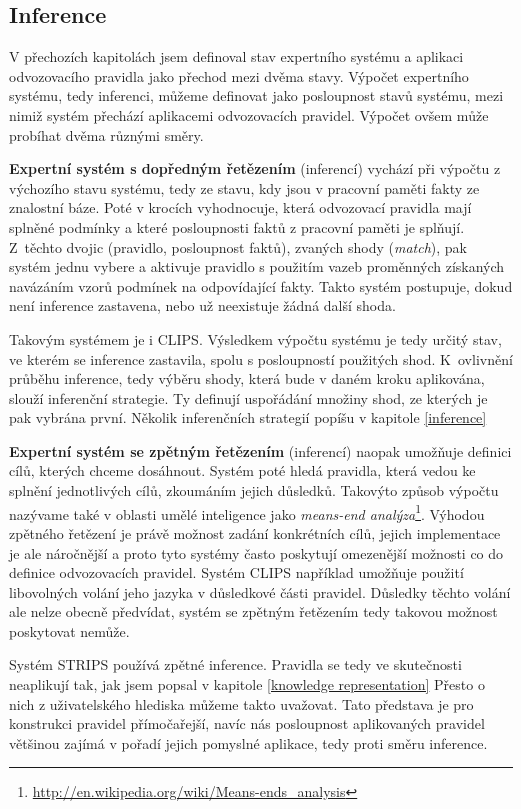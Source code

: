 \subsection{Inference}

V přechozích kapitolách jsem definoval stav expertního systému a aplikaci
odvozovacího pravidla jako přechod mezi dvěma stavy. Výpočet expertního systému,
tedy inferenci, můžeme definovat jako posloupnost stavů systému, mezi nimiž
systém přechází aplikacemi odvozovacích pravidel. Výpočet ovšem může probíhat
dvěma různými směry.

\textbf{Expertní systém s dopředným řetězením} (inferencí) vychází při výpočtu z
výchozího stavu systému, tedy ze stavu, kdy jsou v pracovní paměti fakty ze
znalostní báze. Poté v krocích vyhodnocuje, která odvozovací pravidla mají
splněné podmínky a které posloupnosti faktů z pracovní paměti je splňují.
Z~těchto dvojic (pravidlo, posloupnost faktů), zvaných shody (\emph{match}), pak
systém jednu vybere a aktivuje pravidlo s použitím vazeb proměnných získaných
navázáním vzorů podmínek na odpovídající fakty. Takto systém postupuje, dokud není
inference zastavena, nebo už neexistuje žádná další shoda.

Takovým systémem je i CLIPS. Výsledkem výpočtu systému je tedy určitý stav, ve
kterém se inference zastavila, spolu s posloupností použitých shod. K~ovlivnění
průběhu inference, tedy výběru shody, která bude v daném kroku aplikována,
slouží inferenční strategie. Ty definují uspořádání množiny shod, ze kterých je
pak vybrána první. Několik inferenčních strategií popíšu v kapitole \ref{inference}

\textbf{Expertní systém se zpětným řetězením} (inferencí) naopak umožňuje
definici cílů, kterých chceme dosáhnout. Systém poté hledá pravidla, která
vedou ke splnění jednotlivých cílů, zkoumáním jejich důsledků. Takovýto způsob
výpočtu nazývame také v oblasti umělé inteligence jako \emph{means-end
analýza}\footnote{\url{http://en.wikipedia.org/wiki/Means-ends\_analysis}}.
Výhodou zpětného řetězení je právě možnost zadání konkrétních cílů, jejich
implementace je ale náročnější a proto tyto systémy často poskytují omezenější
možnosti co do definice odvozovacích pravidel. Systém CLIPS například umožňuje
použití libovolných volání jeho jazyka v důsledkové části pravidel. Důsledky
těchto volání ale nelze obecně předvídat, systém se zpětným řetězením tedy
takovou možnost poskytovat nemůže.

Systém STRIPS používá zpětné inference. Pravidla se tedy ve skutečnosti
neaplikují tak, jak jsem popsal v kapitole \ref{knowledge representation} Přesto o
nich z uživatelského hlediska můžeme takto uvažovat. Tato představa je pro
konstrukci pravidel přímočařejší, navíc nás posloupnost aplikovaných pravidel
většinou zajímá v pořadí jejich pomyslné aplikace, tedy proti směru inference.

